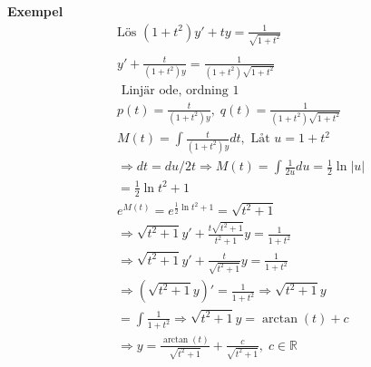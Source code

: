 \begin{multicols}{2}
\textbf{Exempel} 
\begin{align*}
  &\text{Lös } (1+t^2)y' + ty = \frac{1}{\sqrt{1+t^2}} \\
  &\\
  &y'+\frac{t}{(1+t^2)y} = \frac{1}{(1+t^2)\sqrt{1+t^2}} \\
  &\text{ Linjär ode, ordning 1} \\
  &p(t)=\frac{t}{(1+t^2)y}, \; q(t)=\frac{1}{(1+t^2)\sqrt{1+t^2}} \\
  &M(t) = \int \frac{t}{(1+t^2)y}dt, \text{ Låt } u=1+t^2 \\
  &\Rightarrow dt = du/2t \Rightarrow M(t)=\int\frac{1}{2u}du = \frac{1}{2}\ln{|u|} \\
  &= \frac{1}{2}\ln{t^2+1} \\
  &e^{M(t)}=e^{\frac{1}{2}\ln{t^2+1}}=\sqrt{t^2+1} \\
  &\Rightarrow \sqrt{t^2+1}y'+\frac{t\sqrt{t^2+1}}{t^2+1}y = \frac{1}{1+t^2} \\
  &\Rightarrow \sqrt{t^2+1}y'+\frac{t}{\sqrt{t^2+1}}y = \frac{1}{1+t^2} \\
  &\Rightarrow (\sqrt{t^2+1}y)' = \frac{1}{1+t^2} \Rightarrow \sqrt{t^2+1}y \\
  &= \int\frac{1}{1+t^2} \Rightarrow \sqrt{t^2+1}y = \arctan{(t)} +c \\
  &\Rightarrow y = \frac{\arctan{(t)}}{\sqrt{t^2+1}} +\frac{c}{{\sqrt{t^2+1}}}, \; c\in\mathbb{R} \\
\end{align*}




\end{multicols}
